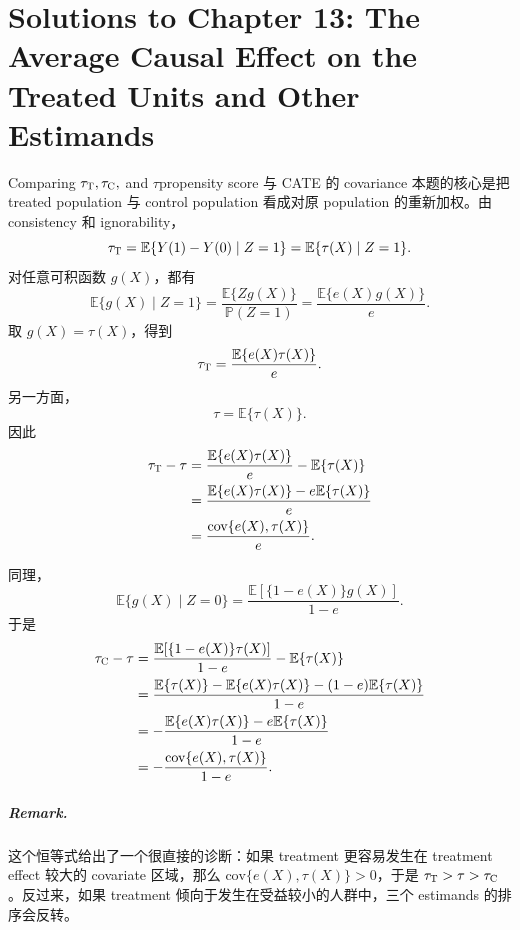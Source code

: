\chapter{Solutions to Chapter 13: The Average Causal Effect on the Treated Units and Other Estimands}
\label{sol:chapter13}

\begin{exercisesolution}{Comparing $\tau_\textsc{T}, \tau_\textsc{C},$ and $\tau$}{propensity score 与 CATE 的 covariance}
本题的核心是把 treated population 与 control population 看成对原 population 的重新加权。由 consistency 和 ignorability，
\[
\tau_\textsc{T}
=\mathbb{E}\{Y(1)-Y(0)\mid Z=1\}
=\mathbb{E}\{\tau(X)\mid Z=1\}.
\]
对任意可积函数 $g(X)$，都有
\[
\mathbb{E}\{g(X)\mid Z=1\}
=\frac{\mathbb{E}\{Zg(X)\}}{\mathbb{P}(Z=1)}
=\frac{\mathbb{E}\{e(X)g(X)\}}{e}.
\]
取 $g(X)=\tau(X)$，得到
\[
\tau_\textsc{T}
=\frac{\mathbb{E}\{e(X)\tau(X)\}}{e}.
\]
另一方面，
\[
\tau=\mathbb{E}\{\tau(X)\}.
\]
因此
\begin{align*}
\tau_\textsc{T}-\tau
&=\frac{\mathbb{E}\{e(X)\tau(X)\}}{e}
  -\mathbb{E}\{\tau(X)\} \\
&=\frac{\mathbb{E}\{e(X)\tau(X)\}
  -e\mathbb{E}\{\tau(X)\}}{e} \\
&=\frac{\text{cov}\{e(X),\tau(X)\}}{e}.
\end{align*}

同理，
\[
\mathbb{E}\{g(X)\mid Z=0\}
=\frac{\mathbb{E}[\{1-e(X)\}g(X)]}{1-e}.
\]
于是
\begin{align*}
\tau_\textsc{C}-\tau
&=\frac{\mathbb{E}[\{1-e(X)\}\tau(X)]}{1-e}
  -\mathbb{E}\{\tau(X)\} \\
&=\frac{\mathbb{E}\{\tau(X)\}
  -\mathbb{E}\{e(X)\tau(X)\}
  -(1-e)\mathbb{E}\{\tau(X)\}}{1-e} \\
&=-\frac{\mathbb{E}\{e(X)\tau(X)\}
  -e\mathbb{E}\{\tau(X)\}}{1-e} \\
&=-\frac{\text{cov}\{e(X),\tau(X)\}}{1-e}.
\end{align*}

\paragraph{Remark.}
这个恒等式给出了一个很直接的诊断：如果 treatment 更容易发生在 treatment effect 较大的 covariate 区域，那么 $\text{cov}\{e(X),\tau(X)\}>0$，于是 $\tau_\textsc{T}>\tau>\tau_\textsc{C}$。反过来，如果 treatment 倾向于发生在受益较小的人群中，三个 estimands 的排序会反转。
\end{exercisesolution}

